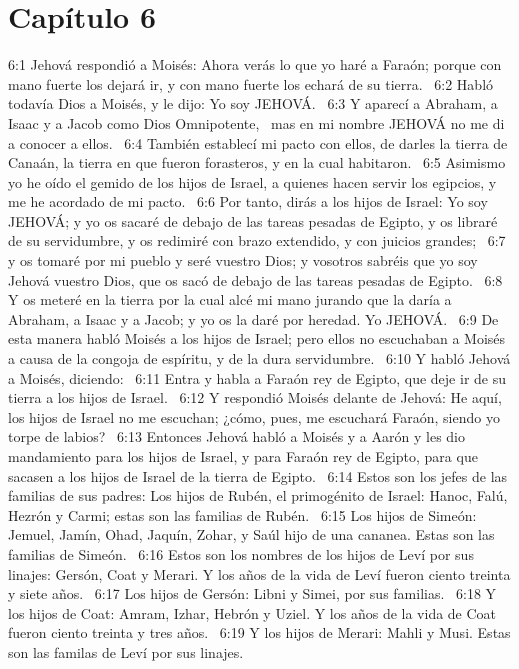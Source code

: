\section*{Capítulo 6 }

6:1 Jehová respondió a Moisés: Ahora verás lo que yo haré a Faraón; porque con mano fuerte los dejará ir, y con mano fuerte los echará de su tierra.  
6:2 Habló todavía Dios a Moisés, y le dijo: Yo soy JEHOVÁ.  
6:3 Y aparecí a Abraham, a Isaac y a Jacob como Dios Omnipotente,  mas en mi nombre JEHOVÁ no me di a conocer a ellos.  
6:4 También establecí mi pacto con ellos, de darles la tierra de Canaán, la tierra en que fueron forasteros, y en la cual habitaron.  
6:5 Asimismo yo he oído el gemido de los hijos de Israel, a quienes hacen servir los egipcios, y me he acordado de mi pacto.  
6:6 Por tanto, dirás a los hijos de Israel: Yo soy JEHOVÁ; y yo os sacaré de debajo de las tareas pesadas de Egipto, y os libraré de su servidumbre, y os redimiré con brazo extendido, y con juicios grandes;  
6:7 y os tomaré por mi pueblo y seré vuestro Dios; y vosotros sabréis que yo soy Jehová vuestro Dios, que os sacó de debajo de las tareas pesadas de Egipto.  
6:8 Y os meteré en la tierra por la cual alcé mi mano jurando que la daría a Abraham, a Isaac y a Jacob; y yo os la daré por heredad. Yo JEHOVÁ.  
6:9 De esta manera habló Moisés a los hijos de Israel; pero ellos no escuchaban a Moisés a causa de la congoja de espíritu, y de la dura servidumbre.  
6:10 Y habló Jehová a Moisés, diciendo:  
6:11 Entra y habla a Faraón rey de Egipto, que deje ir de su tierra a los hijos de Israel.  
6:12 Y respondió Moisés delante de Jehová: He aquí, los hijos de Israel no me escuchan; ¿cómo, pues, me escuchará Faraón, siendo yo torpe de labios?  
6:13 Entonces Jehová habló a Moisés y a Aarón y les dio mandamiento para los hijos de Israel, y para Faraón rey de Egipto, para que sacasen a los hijos de Israel de la tierra de Egipto.  
6:14 Estos son los jefes de las familias de sus padres: Los hijos de Rubén, el primogénito de Israel: Hanoc, Falú, Hezrón y Carmi; estas son las familias de Rubén.  
6:15 Los hijos de Simeón: Jemuel, Jamín, Ohad, Jaquín, Zohar, y Saúl hijo de una cananea. Estas son las familias de Simeón.  
6:16 Estos son los nombres de los hijos de Leví por sus linajes: Gersón, Coat y Merari. Y los años de la vida de Leví fueron ciento treinta y siete años.  
6:17 Los hijos de Gersón: Libni y Simei, por sus familias.  
6:18 Y los hijos de Coat: Amram, Izhar, Hebrón y Uziel. Y los años de la vida de Coat fueron ciento treinta y tres años.  
6:19 Y los hijos de Merari: Mahli y Musi. Estas son las familas de Leví por sus linajes. 
